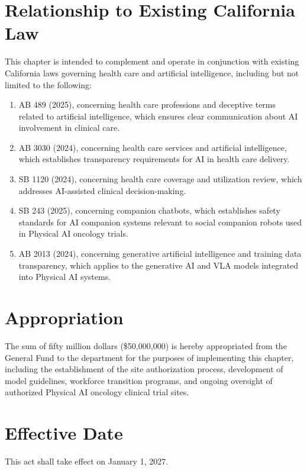 \documentclass[11pt,letterpaper]{article}
\begin{document}
\section{Relationship to Existing California Law}

This chapter is intended to complement and operate in conjunction with
existing California laws governing health care and artificial intelligence,
including but not limited to the following:

\begin{enumerate}[label=(\alph*)]
\item AB 489 (2025), concerning health care professions and deceptive terms
  related to artificial intelligence, which ensures clear communication about
  AI involvement in clinical care.

\item AB 3030 (2024), concerning health care services and artificial
  intelligence, which establishes transparency requirements for AI in health
  care delivery.

\item SB 1120 (2024), concerning health care coverage and utilization review,
  which addresses AI-assisted clinical decision-making.

\item SB 243 (2025), concerning companion chatbots, which establishes safety
  standards for AI companion systems relevant to social companion robots used
  in Physical AI oncology trials.

\item AB 2013 (2024), concerning generative artificial intelligence and
  training data transparency, which applies to the generative AI and VLA
  models integrated into Physical AI systems.
\end{enumerate}

\section{Appropriation}

The sum of fifty million dollars (\$50,000,000) is hereby appropriated from the
General Fund to the department for the purposes of implementing this chapter,
including the establishment of the site authorization process, development of
model guidelines, workforce transition programs, and ongoing oversight of
authorized Physical AI oncology clinical trial sites.

\section{Effective Date}

This act shall take effect on January 1, 2027.
\end{document}
